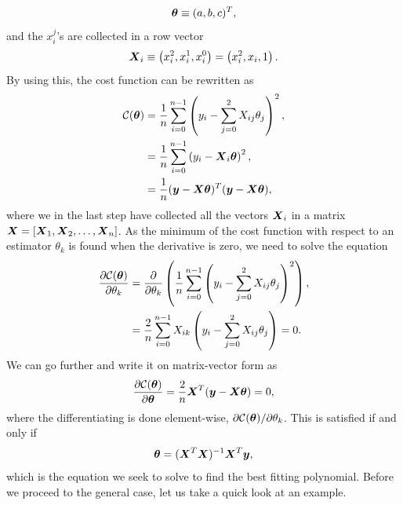 \begin{equation}
\boldsymbol{{\theta}}\equiv(a,b,c)^T,
\end{equation}
and the $x_i^j$'s are collected in a row vector
\begin{equation}
\boldsymbol{{X}}_i\equiv\left(x_i^2, x_i^1, x_i^0\right)=\left(x_i^2, x_i, 1\right).
\end{equation}
By using this, the cost function can be rewritten as
\begin{equation}
\begin{aligned}
\mathcal{C}(\boldsymbol{{\theta}})&=\frac{1}{n}\sum_{i=0}^{n-1}\left(y_i-\sum_{j=0}^2X_{ij}\theta_j\right)^2,\\
&=\frac{1}{n}\sum_{i=0}^{n-1}\left(y_i-\boldsymbol{{X}}_i\boldsymbol{{\theta}}\right)^2,\\
&=\frac{1}{n}(\boldsymbol{{y}}-\boldsymbol{{X}}\boldsymbol{{\theta}})^T(\boldsymbol{{y}}-\boldsymbol{{X}}\boldsymbol{{\theta}}),
\end{aligned}
\label{eq:polynomialcost}
\end{equation}
where we in the last step have collected all the vectors $\boldsymbol{{X}}_i$ in a matrix $\boldsymbol{{X}}=[\boldsymbol{{X}}_1,\boldsymbol{{X}}_2,\hdots,\boldsymbol{{X}}_n]$. As the minimum of the cost function with respect to an estimator $\theta_k$ is found when the derivative is zero, we need to solve the equation
\begin{equation}
\begin{aligned}
\frac{\partial \mathcal{C}(\boldsymbol{{\theta}})}{\partial\theta_k} &=\frac{\partial}{\partial\theta_k}\left(\frac{1}{n}\sum_{i=0}^{n-1}\left(y_i-\sum_{j=0}^2X_{ij}\theta_j\right)^2\right),\\
&=\frac{2}{n}\sum_{i=0}^{n-1}X_{ik}\left(y_i-\sum_{j=0}^2X_{ij}\theta_j\right)=0.
\end{aligned}
\end{equation}
We can go further and write it on matrix-vector form as
\begin{equation}
\frac{\partial \mathcal{C}(\boldsymbol{{\theta}})}{\partial\boldsymbol{{\theta}}}=\frac{2}{n}\boldsymbol{{X}}^T(\boldsymbol{{y}}-\boldsymbol{{X}}\boldsymbol{{\theta}})=0,
\end{equation}
where the differentiating is done element-wise, $\partial\mathcal{C(\boldsymbol{{\theta}})}/\partial\theta_k$. This is satisfied if and only if
\begin{equation}
\boldsymbol{{\theta}}=(\boldsymbol{{X}}^T\boldsymbol{{X}})^{-1}\boldsymbol{{X}}^T\boldsymbol{{y}},
\label{eq:polynomialestimators}
\end{equation}
which is the equation we seek to solve to find the best fitting polynomial. Before we proceed to the general case, let us take a quick look at an example.

